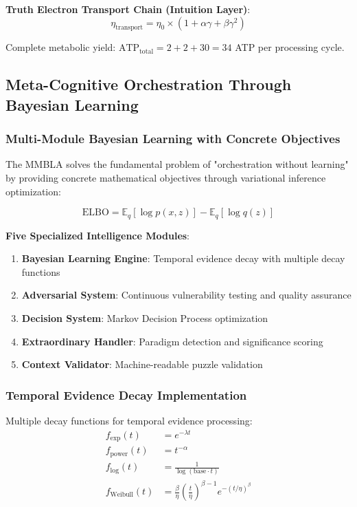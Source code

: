 \documentclass[12pt,a4paper]{article}
\begin{document}
\textbf{Truth Electron Transport Chain (Intuition Layer)}:
\begin{equation}
\eta_{\text{transport}} = \eta_0 \times (1 + \alpha\gamma + \beta\gamma^2)
\end{equation}

Complete metabolic yield: $\text{ATP}_{\text{total}} = 2 + 2 + 30 = 34$ ATP per processing cycle.

\subsection{Meta-Cognitive Orchestration Through Bayesian Learning}

\subsubsection{Multi-Module Bayesian Learning with Concrete Objectives}

The MMBLA solves the fundamental problem of "orchestration without learning" by providing concrete mathematical objectives through variational inference optimization:

\begin{equation}
\text{ELBO} = \mathbb{E}_q[\log p(x,z)] - \mathbb{E}_q[\log q(z)]
\end{equation}

\textbf{Five Specialized Intelligence Modules}:
\begin{enumerate}
\item \textbf{Bayesian Learning Engine}: Temporal evidence decay with multiple decay functions
\item \textbf{Adversarial System}: Continuous vulnerability testing and quality assurance
\item \textbf{Decision System}: Markov Decision Process optimization
\item \textbf{Extraordinary Handler}: Paradigm detection and significance scoring
\item \textbf{Context Validator}: Machine-readable puzzle validation
\end{enumerate}

\subsubsection{Temporal Evidence Decay Implementation}

Multiple decay functions for temporal evidence processing:
\begin{align}
f_{\text{exp}}(t) &= e^{-\lambda t} \\
f_{\text{power}}(t) &= t^{-\alpha} \\
f_{\text{log}}(t) &= \frac{1}{\log(\text{base} \cdot t)} \\
f_{\text{Weibull}}(t) &= \frac{\beta}{\eta}\left(\frac{t}{\eta}\right)^{\beta-1}e^{-(t/\eta)^{\beta}}
\end{align}
\end{document}
